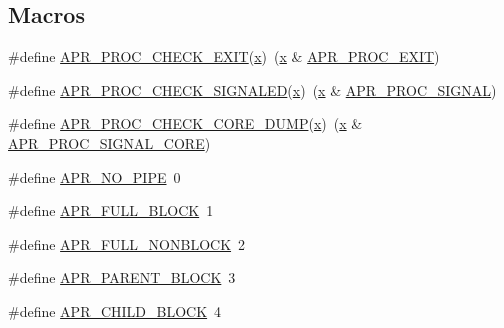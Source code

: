 \subsection*{Macros}
\begin{DoxyCompactItemize}
\item 
\#define \hyperlink{group__apr__thread__proc_ga689b0f3953cde83a4092931bad8b7183}{A\+P\+R\+\_\+\+P\+R\+O\+C\+\_\+\+C\+H\+E\+C\+K\+\_\+\+E\+X\+IT}(\hyperlink{pcregrep_8txt_a4242e9148f20c002763bf4ba53b26ad6}{x})~(\hyperlink{pcregrep_8txt_a4242e9148f20c002763bf4ba53b26ad6}{x} \& \hyperlink{group__apr__thread__proc_ggac097b4fa41e67024711c5983446d0951a977f140c82333af62aa4bed8c99a3ee2}{A\+P\+R\+\_\+\+P\+R\+O\+C\+\_\+\+E\+X\+IT})
\item 
\#define \hyperlink{group__apr__thread__proc_gaa0a8a0b8785cc9392059c7accd71f5f6}{A\+P\+R\+\_\+\+P\+R\+O\+C\+\_\+\+C\+H\+E\+C\+K\+\_\+\+S\+I\+G\+N\+A\+L\+ED}(\hyperlink{pcregrep_8txt_a4242e9148f20c002763bf4ba53b26ad6}{x})~(\hyperlink{pcregrep_8txt_a4242e9148f20c002763bf4ba53b26ad6}{x} \& \hyperlink{group__apr__thread__proc_ggac097b4fa41e67024711c5983446d0951a7e3421d18abe458ca27822d19424225b}{A\+P\+R\+\_\+\+P\+R\+O\+C\+\_\+\+S\+I\+G\+N\+AL})
\item 
\#define \hyperlink{group__apr__thread__proc_ga2249e96191b5d98d33fb7875bce49410}{A\+P\+R\+\_\+\+P\+R\+O\+C\+\_\+\+C\+H\+E\+C\+K\+\_\+\+C\+O\+R\+E\+\_\+\+D\+U\+MP}(\hyperlink{pcregrep_8txt_a4242e9148f20c002763bf4ba53b26ad6}{x})~(\hyperlink{pcregrep_8txt_a4242e9148f20c002763bf4ba53b26ad6}{x} \& \hyperlink{group__apr__thread__proc_ggac097b4fa41e67024711c5983446d0951a6b667be4983cb59e9bed37ee05a0dcce}{A\+P\+R\+\_\+\+P\+R\+O\+C\+\_\+\+S\+I\+G\+N\+A\+L\+\_\+\+C\+O\+RE})
\item 
\#define \hyperlink{group__apr__thread__proc_gab7cfcb8ed24e6c0a76cd41b5b113ae95}{A\+P\+R\+\_\+\+N\+O\+\_\+\+P\+I\+PE}~0
\item 
\#define \hyperlink{group__apr__thread__proc_ga646af57314e71f4647243f36dd03e5ea}{A\+P\+R\+\_\+\+F\+U\+L\+L\+\_\+\+B\+L\+O\+CK}~1
\item 
\#define \hyperlink{group__apr__thread__proc_gae0707f76da785490830fc3491093767c}{A\+P\+R\+\_\+\+F\+U\+L\+L\+\_\+\+N\+O\+N\+B\+L\+O\+CK}~2
\item 
\#define \hyperlink{group__apr__thread__proc_ga8653bab028b1c2b98754babc2547f988}{A\+P\+R\+\_\+\+P\+A\+R\+E\+N\+T\+\_\+\+B\+L\+O\+CK}~3
\item 
\#define \hyperlink{group__apr__thread__proc_gacad9da4db7a22f46715e50fb8ec1c939}{A\+P\+R\+\_\+\+C\+H\+I\+L\+D\+\_\+\+B\+L\+O\+CK}~4

\end{DoxyCompactItemize}
